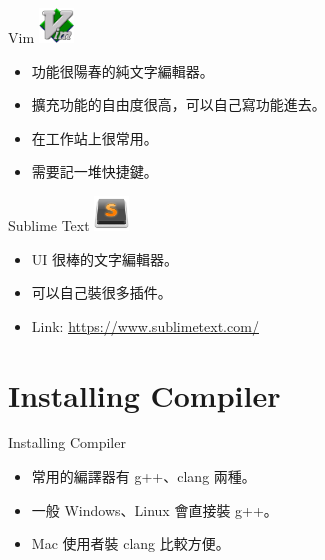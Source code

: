 \documentclass[t]{beamer}
\begin{document}
\begin{frame}{Vim}
  \vspace{0.5em}
  \hspace{2em}
  \includegraphics[height=2.5em]{image/vim.png}
  \vspace{0.5em}
  \begin{itemize}
    \item 功能很陽春的純文字編輯器。
    \item 擴充功能的自由度很高，可以自己寫功能進去。
    \item 在工作站上很常用。
    \item 需要記一堆快捷鍵。
  \end{itemize} 
\end{frame}

\begin{frame}{Sublime Text}
  \vspace{0.5em}
  \hspace{2em}
  \includegraphics[height=2.5em]{image/st.png}
  \vspace{0.5em}
  \begin{itemize}
    \item UI 很棒的文字編輯器。
    \item 可以自己裝很多插件。
    \item Link: \href{https://www.sublimetext.com/}{\underline{https://www.sublimetext.com/}}
  \end{itemize}
\end{frame}

\section{Installing Compiler}
\begin{frame}{Installing Compiler}
  \begin{itemize}
    \item 常用的編譯器有 g++、clang 兩種。
    \item 一般 Windows、Linux 會直接裝 g++。
    \item Mac 使用者裝 clang 比較方便。
  \end{itemize}
\end{frame}
\end{document}
